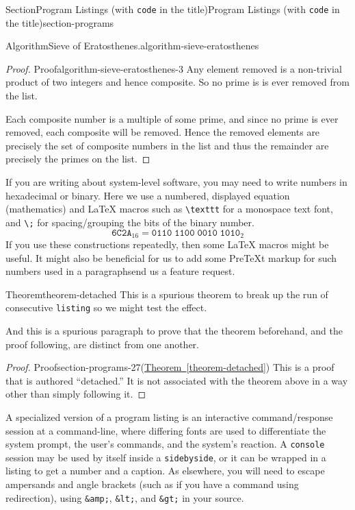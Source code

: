\documentclass[twoside,10pt,]{article}
\newcommand{\xreffont}{\relax}
\newcommand{\mono}[1]{\texttt{#1}}
\numberwithin{equation}{section}
\begin{document}
\begin{sectionptx}{Section}{Program Listings (with \mono{code} in the title)}{}{Program Listings (with \mono{code} in the title)}{}{}{section-programs}
\begin{algorithm}{Algorithm}{Sieve of Eratosthenes.}{}{algorithm-sieve-eratosthenes}
%
\end{algorithm}
\begin{proof}{Proof}{}{algorithm-sieve-eratosthenes-3}
Any element removed is a non-trivial product of two integers and hence composite.  So no prime is is ever removed from the list.%
\par
Each composite number is a multiple of some prime, and since no prime is ever removed, each composite will be removed.  Hence the removed elements are precisely the set of composite numbers in the list and thus the remainder are precisely the primes on the list.%
\end{proof}
%
If you are writing about system-level software, you may need to write numbers in hexadecimal or binary.  Here we use a numbered, displayed equation (mathematics) and \LaTeX{} macros such as \mono{\textbackslash{}texttt} for a monospace text font, and \mono{\textbackslash{};} for spacing\slash{}grouping the bits of the binary number.%
\begin{equation}
\texttt{6C2A}_{16} = \texttt{0110}\;\texttt{1100}\;\texttt{0010}\;\texttt{1010}_{2}\label{section-programs-24-4}
\end{equation}
If you use these constructions repeatedly, then some \LaTeX{} macros might be useful.  It might also be beneficial for us to add some PreTeXt markup for such numbers used in a paragraph\textemdash{}send us a feature request.%
\begin{theorem}{Theorem}{}{}{theorem-detached}%
This is a spurious theorem to break up the run of consecutive \mono{listing} so we might test the effect.%
\end{theorem}
And this is a spurious paragraph to prove that the theorem beforehand, and the proof following, are distinct from one another.%
\begin{proof}{Proof}{}{section-programs-27}\space(\hyperref[theorem-detached]{Theorem~{\xreffont\ref{theorem-detached}}})\space
This is a proof that is authored ``detached.''  It is not associated with the theorem above in a way other than simply following it.%
\end{proof}
A specialized version of a program listing is an interactive command\slash{}response session at a command-line, where differing fonts are used to differentiate the system prompt, the user's commands, and the system's reaction.  A   \mono{console} session may be used by itself inside a \mono{sidebyside}, or it can be wrapped in a listing to get a number and a caption.  As elsewhere, you will need to escape ampersands and angle brackets (such as if you have a command using redirection), using \mono{\&amp;}, \mono{\&lt;}, and \mono{\&gt;} in your source.%

\end{sectionptx}
\end{document}
